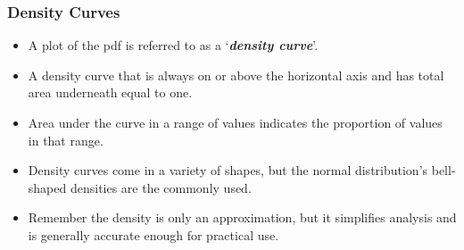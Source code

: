 \begin{frame}

\frametitle{Density Curves}


\begin{itemize}
\item A plot of the pdf is referred to as a `\textbf{\emph{density curve}}'.
\item A density curve that is always on or above the horizontal axis and has total area underneath equal to one.
\item Area under the curve in a range of values indicates the proportion of values in that range.
\item Density curves come in a variety of shapes, but the normal distribution's bell-shaped densities are the commonly used.
\item Remember the density is only an approximation, but it simplifies analysis and is generally accurate enough for practical use.
\end{itemize}
\end{frame}

